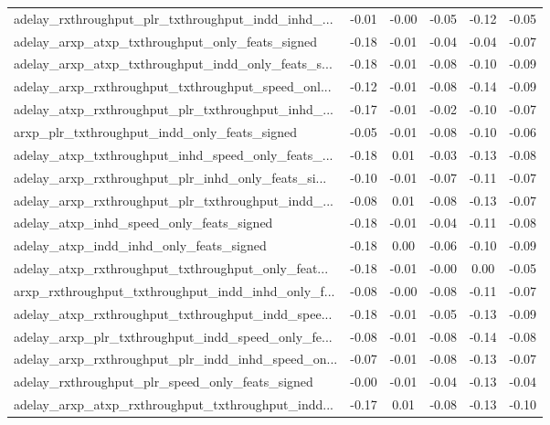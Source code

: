 \begin{tabular}{|l|*{4}{c}|r|}
adelay\_rxthroughput\_plr\_txthroughput\_indd\_inhd\_... & -0.01 & -0.00 &   -0.05 &      -0.12 & -0.05 \\
adelay\_arxp\_atxp\_txthroughput\_only\_feats\_signed    & -0.18 & -0.01 &   -0.04 &      -0.04 & -0.07 \\
adelay\_arxp\_atxp\_txthroughput\_indd\_only\_feats\_s... & -0.18 & -0.01 &   -0.08 &      -0.10 & -0.09 \\
adelay\_arxp\_rxthroughput\_txthroughput\_speed\_onl... & -0.12 & -0.01 &   -0.08 &      -0.14 & -0.09 \\
adelay\_atxp\_rxthroughput\_plr\_txthroughput\_inhd\_... & -0.17 & -0.01 &   -0.02 &      -0.10 & -0.07 \\
arxp\_plr\_txthroughput\_indd\_only\_feats\_signed       & -0.05 & -0.01 &   -0.08 &      -0.10 & -0.06 \\
adelay\_atxp\_txthroughput\_inhd\_speed\_only\_feats\_... & -0.18 &  0.01 &   -0.03 &      -0.13 & -0.08 \\
adelay\_arxp\_rxthroughput\_plr\_inhd\_only\_feats\_si... & -0.10 & -0.01 &   -0.07 &      -0.11 & -0.07 \\
adelay\_arxp\_rxthroughput\_plr\_txthroughput\_indd\_... & -0.08 &  0.01 &   -0.08 &      -0.13 & -0.07 \\
adelay\_atxp\_inhd\_speed\_only\_feats\_signed           & -0.18 & -0.01 &   -0.04 &      -0.11 & -0.08 \\
adelay\_atxp\_indd\_inhd\_only\_feats\_signed            & -0.18 &  0.00 &   -0.06 &      -0.10 & -0.09 \\
adelay\_atxp\_rxthroughput\_txthroughput\_only\_feat... & -0.18 & -0.01 &   -0.00 &       0.00 & -0.05 \\
arxp\_rxthroughput\_txthroughput\_indd\_inhd\_only\_f... & -0.08 & -0.00 &   -0.08 &      -0.11 & -0.07 \\
adelay\_atxp\_rxthroughput\_txthroughput\_indd\_spee... & -0.18 & -0.01 &   -0.05 &      -0.13 & -0.09 \\
adelay\_arxp\_plr\_txthroughput\_indd\_speed\_only\_fe... & -0.08 & -0.01 &   -0.08 &      -0.14 & -0.08 \\
adelay\_arxp\_rxthroughput\_plr\_indd\_inhd\_speed\_on... & -0.07 & -0.01 &   -0.08 &      -0.13 & -0.07 \\
adelay\_rxthroughput\_plr\_speed\_only\_feats\_signed    & -0.00 & -0.01 &   -0.04 &      -0.13 & -0.04 \\
adelay\_arxp\_atxp\_rxthroughput\_txthroughput\_indd... & -0.17 &  0.01 &   -0.08 &      -0.13 & -0.10 \\

\end{tabular}
